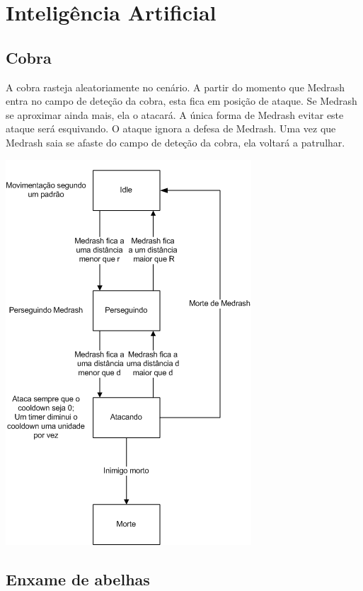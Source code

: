 \section{Inteligência Artificial}

\subsection{Cobra}

A cobra rasteja aleatoriamente no cenário. A partir do momento que
Medrash entra no campo de deteção da cobra, esta fica em posição
de ataque. Se Medrash se aproximar ainda mais, ela o atacará.
A única forma de Medrash evitar este ataque será esquivando. O ataque
ignora a defesa de Medrash.
Uma vez que Medrash saia se afaste do campo de deteção da cobra, ela
voltará a patrulhar.

\begin{center}
 \includegraphics[scale=1]{ia_simples.png}
\end{center}

\subsection{Enxame de abelhas}

